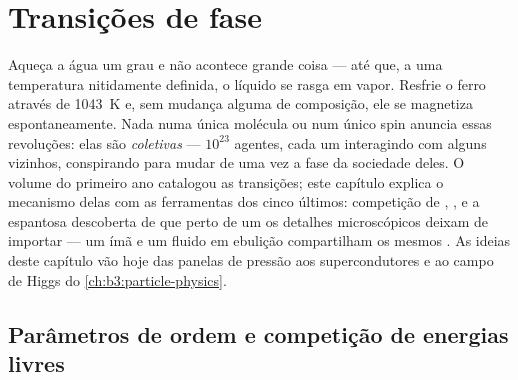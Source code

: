 \chapter{Transições de fase}\label{ch:b3:phase-transitions}

Aqueça a água um grau e não acontece grande coisa --- até que, a uma
temperatura nitidamente definida, o líquido se rasga em vapor.
Resfrie o ferro através de \qty{1043}{K} e, sem mudança alguma de
composição, ele se magnetiza espontaneamente. Nada numa única molécula
ou num único spin anuncia essas revoluções: elas são \emph{coletivas}
--- $10^{23}$ agentes, cada um interagindo com alguns vizinhos,
conspirando para mudar de uma vez a fase da sociedade deles. O volume
do primeiro ano catalogou as transições; este capítulo explica o
mecanismo delas com as ferramentas dos cinco últimos: competição de
, ,  e a espantosa
descoberta de que perto de um  os detalhes microscópicos
deixam de importar --- um ímã e um fluido em ebulição compartilham os
mesmos . As ideias deste capítulo vão hoje das
panelas de pressão aos supercondutores e ao campo de Higgs do
\cref{ch:b3:particle-physics}.

\section{Parâmetros de ordem e competição de energias livres}

